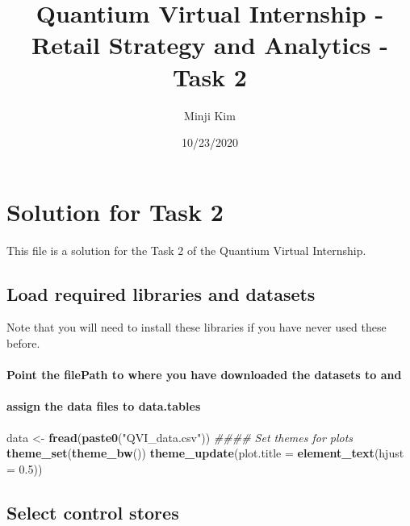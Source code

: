 \documentclass[
]{article}
\title{Quantium Virtual Internship - Retail Strategy and Analytics - Task 2}
\author{Minji Kim}
\date{10/23/2020}
\newenvironment{Shaded}{\begin{snugshade}}{\end{snugshade}}
\newcommand{\CommentTok}[1]{\textcolor[rgb]{0.56,0.35,0.01}{\textit{#1}}}
\newcommand{\DataTypeTok}[1]{\textcolor[rgb]{0.13,0.29,0.53}{#1}}
\newcommand{\FloatTok}[1]{\textcolor[rgb]{0.00,0.00,0.81}{#1}}
\newcommand{\KeywordTok}[1]{\textcolor[rgb]{0.13,0.29,0.53}{\textbf{#1}}}
\newcommand{\NormalTok}[1]{#1}
\newcommand{\StringTok}[1]{\textcolor[rgb]{0.31,0.60,0.02}{#1}}
\begin{document}
\maketitle

\hypertarget{solution-for-task-2}{%
\section{Solution for Task 2}\label{solution-for-task-2}}

This file is a solution for the Task 2 of the Quantium Virtual
Internship.

\hypertarget{load-required-libraries-and-datasets}{%
\subsection{Load required libraries and
datasets}\label{load-required-libraries-and-datasets}}

Note that you will need to install these libraries if you have never
used these before.

\hypertarget{point-the-filepath-to-where-you-have-downloaded-the-datasets-to-and}{%
\paragraph{Point the filePath to where you have downloaded the datasets
to
and}\label{point-the-filepath-to-where-you-have-downloaded-the-datasets-to-and}}

\hypertarget{assign-the-data-files-to-data.tables}{%
\paragraph{assign the data files to
data.tables}\label{assign-the-data-files-to-data.tables}}

\begin{Shaded}
\begin{Highlighting}[]
\NormalTok{data <-}\StringTok{ }\KeywordTok{fread}\NormalTok{(}\KeywordTok{paste0}\NormalTok{(}\StringTok{"QVI_data.csv"}\NormalTok{))}
\CommentTok{#### Set themes for plots}
\KeywordTok{theme_set}\NormalTok{(}\KeywordTok{theme_bw}\NormalTok{())}
\KeywordTok{theme_update}\NormalTok{(}\DataTypeTok{plot.title =} \KeywordTok{element_text}\NormalTok{(}\DataTypeTok{hjust =} \FloatTok{0.5}\NormalTok{))}
\end{Highlighting}
\end{Shaded}

\hypertarget{select-control-stores}{%
\subsection{Select control stores}\label{select-control-stores}}
\end{document}
